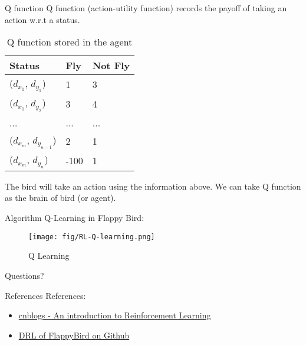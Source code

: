 \documentclass[10pt]{beamer}
\begin{document}
\begin{frame}[fragile]{Q function}
  Q function (action-utility function) records the payoff of taking an action w.r.t a status. 
  \begin{table}  
    \caption{Q function stored in the agent}
    \begin{tabular*}{5cm}{lll}  
    \hline  
    Status & Fly  & Not Fly \\  
    \hline  
    ($d_{x_1}$, $d_{y_1}$)  & 1 & 3 \\  
    ($d_{x_1}$, $d_{y_2}$)  & 3 & 4 \\  
    ... & ... & ... \\
    ($d_{x_m}$, $d_{y_{n-1}}$)  & 2 & 1 \\  
    ($d_{x_m}$, $d_{y_n}$)  & -100 & 1 \\  
    \hline
    \end{tabular*}
  \end{table}

  The bird will take an action using the information above. We can take \alert{Q function} as the brain of bird (or agent).
\end{frame}

\begin{frame}{Algorithm}
  Q-Learning in Flappy Bird:
  \begin{figure}[htbp]
    \centering
    \texttt{[image: fig/RL-Q-learning.png]}
    \caption{Q Learning}
  \end{figure}
\end{frame}

\begin{frame}[standout]
  Questions?
\end{frame}

\begin{frame}{References}
  References:
  \begin{itemize}
    \item \href{https://www.cnblogs.com/yifdu25/p/8169226.html}{cnblogs - An introduction to Reinforcement Learning}
    \item \href{https://github.com/yenchenlin/DeepLearningFlappyBird}{DRL of FlappyBird on Github}
  \end{itemize}
\end{frame}
\end{document}

